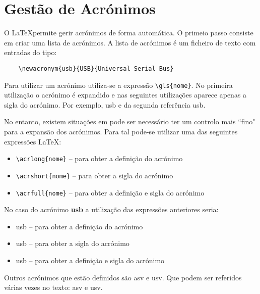 \chapter{Gestão de Acrónimos}
\label{ch:ManAcronym}

O \LaTeX permite gerir acrónimos de forma automática. O primeio passo consiste em criar uma lista de acrónimos.
A lista de acrónimos é um ficheiro de texto com entradas do tipo:

\begin{verbatim}
	\newacronym{usb}{USB}{Universal Serial Bus}
\end{verbatim}


Para utilizar um acrónimo utiliza-se a expressão \Verb|\gls{nome}|. No primeira utilização o acrónimo é expandido 
e nas seguintes utilizações aparece apenas a sigla do acrónimo. Por exemplo, \gls{usb} e da segunda 
referência \gls{usb}.

No entanto, existem situações em pode ser necessário ter um controlo mais ``fino" para a expansão dos acrónimos. 
Para tal pode-se utilizar uma das seguintes expressões \LaTeX:

\begin{itemize}
	\item \Verb|\acrlong{nome}| -- para obter a definição do acrónimo
	\item \Verb|\acrshort{nome}| -- para obter a sigla do acrónimo
	\item \Verb|\acrfull{nome}| -- para obter a definição e sigla do acrónimo
\end{itemize}

No caso do acrónimo \textbf{usb} a utilização das expressões anteriores seria:

\begin{itemize}
	\item \acrlong{usb} -- para obter a definição do acrónimo
	\item \acrshort{usb} -- para obter a sigla do acrónimo
	\item \acrfull{usb} -- para obter a definição e sigla do acrónimo
\end{itemize}

Outros acrónimos que estão definidos são \gls{asv} e \gls{usv}. Que podem ser referidos várias vezes no texto: \gls{asv} e \gls{usv}.

